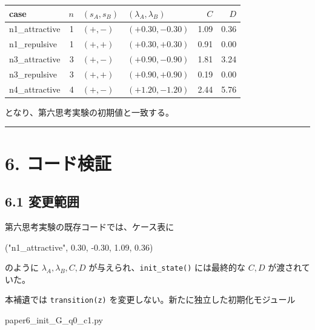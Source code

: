 \documentclass[
  a4paper,
]{ltjsarticle}
\newenvironment{Shaded}{}{}
\newcommand{\FloatTok}[1]{\textcolor[rgb]{0.25,0.63,0.44}{#1}}
\newcommand{\NormalTok}[1]{#1}
\newcommand{\OperatorTok}[1]{\textcolor[rgb]{0.40,0.40,0.40}{#1}}
\newcommand{\StringTok}[1]{\textcolor[rgb]{0.25,0.44,0.63}{#1}}
\newcounter{none} %
\begin{document}
{\def\LTcaptype{none} %
\begin{longtable}[]{@{}lrllrr@{}}
\toprule\noalign{}
case & \(n\) & \((s_A,s_B)\) & \((\lambda_A,\lambda_B)\) & \(C\) &
\(D\) \\
\midrule\noalign{}
\endhead
\bottomrule\noalign{}
\endlastfoot
n1\_attractive & 1 & \((+,-)\) & \((+0.30,-0.30)\) & 1.09 & 0.36 \\
n1\_repulsive & 1 & \((+,+)\) & \((+0.30,+0.30)\) & 0.91 & 0.00 \\
n3\_attractive & 3 & \((+,-)\) & \((+0.90,-0.90)\) & 1.81 & 3.24 \\
n3\_repulsive & 3 & \((+,+)\) & \((+0.90,+0.90)\) & 0.19 & 0.00 \\
n4\_attractive & 4 & \((+,-)\) & \((+1.20,-1.20)\) & 2.44 & 5.76 \\
\end{longtable}
}

となり、第六思考実験の初期値と一致する。

\begin{center}\rule{0.5\linewidth}{0.5pt}\end{center}

\section{6. コード検証}\label{ux30b3ux30fcux30c9ux691cux8a3c}

\subsection{6.1 変更範囲}\label{ux5909ux66f4ux7bc4ux56f2}

第六思考実験の既存コードでは、ケース表に

\begin{Shaded}
\begin{Highlighting}[]
\NormalTok{(}\StringTok{"n1\_attractive"}\NormalTok{, }\FloatTok{0.30}\NormalTok{, }\OperatorTok{{-}}\FloatTok{0.30}\NormalTok{, }\FloatTok{1.09}\NormalTok{, }\FloatTok{0.36}\NormalTok{)}
\end{Highlighting}
\end{Shaded}

のように \(\lambda_A,\lambda_B,C,D\) が与えられ、\texttt{init\_state()}
には最終的な \(C,D\) が渡されていた。

本補遺では \texttt{transition(z)}
を変更しない。新たに独立した初期化モジュール

\begin{Shaded}
\begin{Highlighting}[]
\NormalTok{paper6\_init\_G\_q0\_c1.py}
\end{Highlighting}
\end{Shaded}
\end{document}
